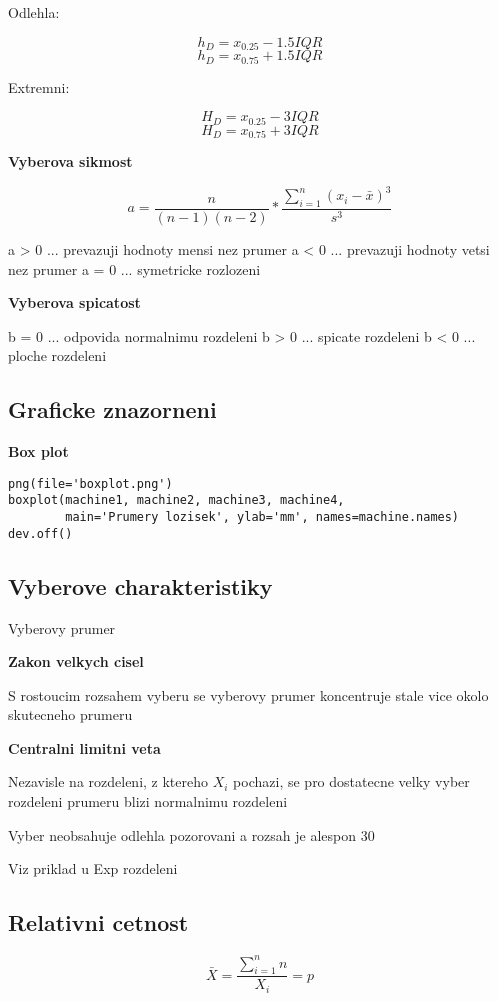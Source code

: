 \documentclass{article}
\begin{document}
Odlehla:

\[ h_D = x_{0.25} - 1.5IQR \]
\[ h_D = x_{0.75} + 1.5IQR \]

Extremni: 

\[ H_D = x_{0.25} - 3IQR \]
\[ H_D = x_{0.75} + 3IQR \]

\textbf{Vyberova sikmost}

\[ a = \frac{n}{(n-1)(n-2)} * \frac{ \sum_{i=1}^{n} (x_i - \bar{x})^3 }{s^3} \]

a > 0 ... prevazuji hodnoty mensi nez prumer
a < 0 ... prevazuji hodnoty vetsi nez prumer
a = 0 ... symetricke rozlozeni

\textbf{Vyberova spicatost}

b = 0 ... odpovida normalnimu rozdeleni
b > 0 ... spicate rozdeleni
b < 0 ... ploche rozdeleni

\subsection{Graficke znazorneni}

\textbf{Box plot}

\begin{verbatim}
png(file='boxplot.png')
boxplot(machine1, machine2, machine3, machine4, 
        main='Prumery lozisek', ylab='mm', names=machine.names)
dev.off()
\end{verbatim}

\subsection{Vyberove charakteristiky}

Vyberovy prumer

\textbf{Zakon velkych cisel}

S rostoucim rozsahem vyberu se vyberovy prumer koncentruje stale vice okolo skutecneho prumeru

\textbf{Centralni limitni veta}

Nezavisle na rozdeleni, z ktereho $X_i$ pochazi, se pro dostatecne velky vyber rozdeleni prumeru
blizi normalnimu rozdeleni

Vyber neobsahuje odlehla pozorovani a rozsah je alespon 30

Viz priklad u Exp rozdeleni

\subsection{Relativni cetnost}

\[ \bar{X} = \frac{\sum_{i=1}^{n} n}{X_i} = p \]
\end{document}
